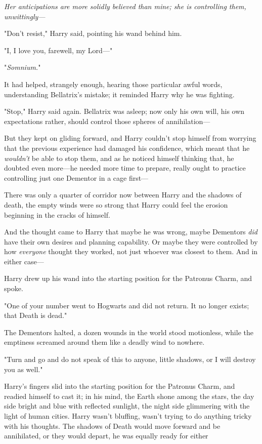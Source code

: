 \emph{Her anticipations are more solidly believed than mine; she is controlling
them, unwittingly—}

"Don't resist," Harry said, pointing his wand behind him.

"I, I love you, farewell, my Lord—"

"\emph{Somnium.}"

It had helped, strangely enough, hearing those particular awful words,
understanding Bellatrix's mistake; it reminded Harry why he was fighting.

"Stop," Harry said again. Bellatrix was asleep; now only his own will, his own
expectations rather, should control those spheres of annihilation—

But they kept on gliding forward, and Harry couldn't stop himself from worrying
that the previous experience had damaged his confidence, which meant that he
\emph{wouldn't} be able to stop them, and as he noticed himself thinking that,
he doubted even more—he needed more time to prepare, really ought to practice
controlling just one Dementor in a cage first—

There was only a quarter of corridor now between Harry and the shadows of
death, the empty winds were so strong that Harry could feel the erosion
beginning in the cracks of himself.

And the thought came to Harry that maybe he was wrong, maybe Dementors
\emph{did} have their own desires and planning capability. Or maybe they were
controlled by how \emph{everyone} thought they worked, not just whoever was
closest to them. And in either case—

Harry drew up his wand into the starting position for the Patronus Charm, and
spoke.

"One of your number went to Hogwarts and did not return. It no longer exists;
that Death is dead."

The Dementors halted, a dozen wounds in the world stood motionless, while the
emptiness screamed around them like a deadly wind to nowhere.

"Turn and go and do not speak of this to anyone, little shadows, or I will
destroy you as well."

Harry's fingers slid into the starting position for the Patronus Charm, and
readied himself to cast it; in his mind, the Earth shone among the stars, the
day side bright and blue with reflected sunlight, the night side glimmering
with the light of human cities. Harry wasn't bluffing, wasn't trying to do
anything tricky with his thoughts. The shadows of Death would move forward and
be annihilated, or they would depart, he was equally ready for either{\el}

